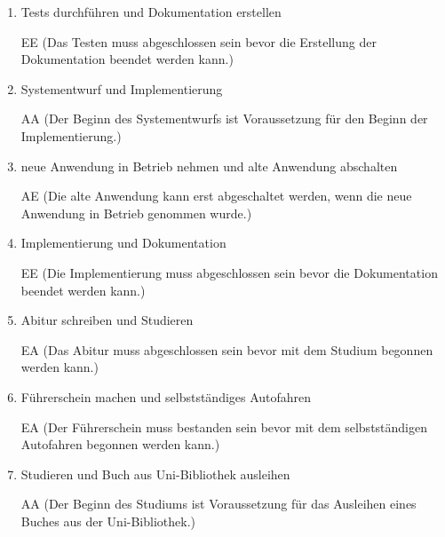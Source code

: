 \documentclass{bschlangaul-aufgabe}
\begin{document}
\begin{enumerate}


\item Tests durchführen und Dokumentation erstellen

\begin{bAntwort}
EE (Das Testen muss abgeschlossen sein bevor die Erstellung der
Dokumentation beendet werden kann.)
\end{bAntwort}


\item Systementwurf und Implementierung

\begin{bAntwort}
AA (Der Beginn des Systementwurfs ist Voraussetzung für den Beginn der
Implementierung.)
\end{bAntwort}


\item neue Anwendung in Betrieb nehmen und alte Anwendung abschalten

\begin{bAntwort}
AE (Die alte Anwendung kann erst abgeschaltet werden, wenn die neue
Anwendung in Betrieb genommen wurde.)
\end{bAntwort}


\item Implementierung und Dokumentation

\begin{bAntwort}
EE (Die Implementierung muss abgeschlossen sein bevor die Dokumentation
beendet werden kann.)
\end{bAntwort}


\item Abitur schreiben und Studieren

\begin{bAntwort}
EA (Das Abitur muss abgeschlossen sein bevor mit dem Studium begonnen
werden kann.)
\end{bAntwort}


\item Führerschein machen und selbstständiges Autofahren

\begin{bAntwort}
EA (Der Führerschein muss bestanden sein bevor mit dem selbstständigen
Autofahren begonnen werden kann.)
\end{bAntwort}


\item Studieren und Buch aus Uni-Bibliothek ausleihen

\begin{bAntwort}
AA (Der Beginn des Studiums ist Voraussetzung für das Ausleihen eines
Buches aus der Uni-Bibliothek.)
\end{bAntwort}
\end{enumerate}
\end{document}
